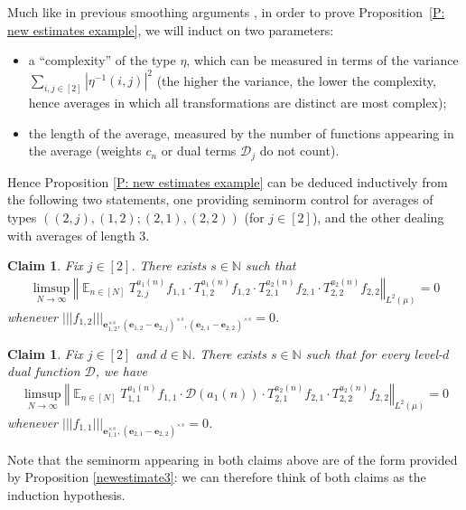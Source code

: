 \documentclass[11pt]{amsart}
\newtheorem{claim}[lemma]{Claim}
\theoremstyle{definition}
\DeclareMathOperator*{\E}{\mathbb{E}}
\newcommand{\N}{{\mathbb N}}
\newcommand{\CD}{{\mathcal D}}
\newcommand{\be}{{\mathbf{e}}}
\newcommand{\norm}[1]{\left\Vert #1\right\Vert}
\newcommand{\nnorm}[1]{\lvert\!|\!| #1|\!|\!\rvert}
\newcommand{\inv}{^{-1}}
\newcommand{\1}{{\mathbf{1}}}
\begin{document}
Much like in previous smoothing arguments \cite{DKKST24, FrKu22b, FrKu22a}, in order to prove Proposition~\ref{P: new estimates example}, we will induct on two parameters: 
\begin{itemize}
    \item a ``complexity'' of the type $\eta$, which can be measured in terms of the variance $\sum\limits_{i,j\in[2]}|\eta\inv(i,j)|^2$ (the higher the variance, the lower the complexity, hence averages in which all transformations are distinct are most complex);
    \item the length of the average, measured by the number of functions appearing in the average (weights $c_n$ or dual terms $\CD_j$ do not count).
\end{itemize}
Hence Proposition \ref{P: new estimates example} can be deduced inductively from the following two statements, one providing seminorm control for averages of types $((2,j),(1,2);(2,1),(2,2))$ (for $j\in[2]$), and the other dealing with averages of length 3.
\begin{claim}\label{C: lower type example}
    Fix $j\in[2]$. There exists $s\in\N$ such that 
    \begin{align*}%
    \limsup_{N\to\infty}\norm{\E_{n\in [N]} T_{2,j}^{a_{1}(n)} f_{1,1}\cdot T_{1,2}^{a_{1}(n)} f_{1,2}\cdot T_{2,1}^{a_{2}(n)} f_{2,1}\cdot T_{2,2}^{a_{2}(n)} f_{2,2}}_{L^2(\mu)} = 0
    \end{align*}
    whenever $\nnorm{f_{1,2}}_{\be_{1,2}^{\times s}, (\be_{1,2}-\be_{2,j})^{\times s}, (\be_{2,1}-\be_{2,2})^{\times s}}=0$.
\end{claim}
\begin{claim}\label{C: lower length example}
    Fix $j\in[2]$ and $d\in\N$. There exists $s\in\N$ such that for every level-$d$ dual function $\CD$, we have
    \begin{align*}%
    \limsup_{N\to\infty}\norm{\E_{n\in [N]} T_{1,1}^{a_{1}(n)} f_{1,1}\cdot \CD({a_{1}(n)})\cdot T_{2,1}^{a_{2}(n)} f_{2,1}\cdot T_{2,2}^{a_{2}(n)} f_{2,2}}_{L^2(\mu)} = 0
    \end{align*}
    whenever $\nnorm{f_{1,1}}_{\be_{1,1}^{\times s}, (\be_{2,1}-\be_{2,2})^{\times s}}=0$.
\end{claim}
Note that the seminorm appearing in both claims above are of the form provided by Proposition \ref{newestimate3}: we can therefore think of both claims as the induction hypothesis.
\end{document}
